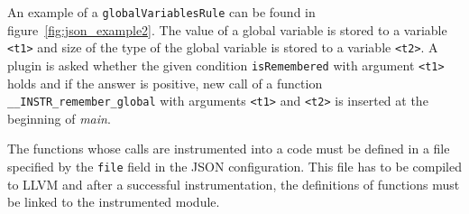 An example of a \texttt{globalVariablesRule} can be found in
figure~\ref{fig:json_example2}. The value of a global variable is stored to a
variable \texttt{<t1>} and size of the type of the global variable is stored to
a variable \texttt{<t2>}. A plugin is asked whether the given condition
\texttt{isRemembered} with argument \texttt{<t1>} holds and if the answer is
positive, new call of a function \texttt{\_\_INSTR\_remember\_global} with
arguments \texttt{<t1>} and \texttt{<t2>} is inserted at the beginning of
\emph{main}.

The functions whose calls are instrumented into a code must be defined in a
file specified by the \texttt{file} field in the JSON configuration. This file
has to be compiled to LLVM and after a successful instrumentation, the
definitions of functions must be linked to the instrumented module.
